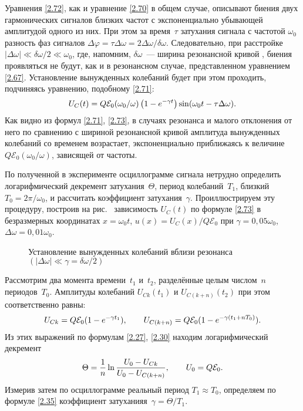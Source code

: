Уравнения \eqref{2.72}, как и уравнение \eqref{2.70} в общем случае, описывают
биения двух гармонических сигналов близких частот с экспоненциально убывающей
амплитудой одного из них. При этом за время~$\tau$ затухания сигнала с частотой
$\omega_0$ разность фаз сигналов
$\Delta\varphi=\tau\Delta\omega=2\Delta\omega/\delta\omega$. Следовательно, при
расстройке $|\Delta\omega|\ll\delta\omega/2\ll\omega_0$, где, напомним,
$\delta\omega$~--- ширина резонансной кривой , биения
проявляться не будут, как и в резонансном случае, представленном уравнением
\eqref{2.67}. Установление вынужденных колебаний будет при этом проходить,
подчиняясь уравнению, подобному \eqref{2.71}:
\begin{equation}\eqmark{2.73}
	U_C(t)=Q\mathcal{E}_0(\omega_0/\omega)\left(1-e^{-\gamma
t}\right)\sin(\omega_0t-\tau\Delta\omega).
\end{equation}
Как видно из формул \eqref{2.71}, \eqref{2.73}, в случаях резонанса и малого
отклонения от него по сравнению с шириной резонансной кривой амплитуда
вынужденных колебаний со временем возрастает, экспоненциально приближаясь к величине $Q\mathcal{E}_0(\omega_0/\omega)$, зависящей от частоты.

По полученной в эксперименте осциллограмме сигнала нетрудно определить
логарифмический декремент затухания~$\Theta$, период колебаний~$T_1$, близкий
$T_0=2\pi/\omega_0$, и рассчитать коэффициент затухания~$\gamma$. Проиллюстрируем эту процедуру, построив на рис.~
зависимость $U_C(t)$ по формуле \eqref{2.73} в безразмерных координатах $x = \omega_0t$, $u(x) = U_C(x)/Q\mathcal{E}_0$ при $\gamma = 0,05\omega_0$, $\Delta \omega = 0,01\omega_0$.
\begin{figure}[h!]
	\centering
	\caption{Установление вынужденных колебаний вблизи резонанса
$(|\Delta\omega|\ll\gamma=\delta\omega/2)$}
\end{figure}
Рассмотрим два момента времени~$t_1$ и~$t_2$, разделённые целым числом~$n$
периодов~$T_0$. Амплитуды колебаний $U_{Ck}(t_1)$ и $U_{C(k+n)}(t_2)$ при этом
соответственно равны:
\begin{equation}\eqmark{2.74}
U_{Ck}=Q\mathcal{E}_0(1-e^{-\gamma t_1}), \qquad U_{C(k+n)}=Q\mathcal{E}_0(1-e^{-\gamma(t_1+nT_0)}).
\end{equation}
Из этих выражений по формулам \eqref{2.27}, \eqref{2.30} находим логарифмический декремент
\begin{equation}\eqmark{2.75}
\Theta=\dfrac{1}{n}\ln\dfrac{U_0-U_{Ck}}{U_0-U_{C(k+n)}}, \qquad U_0 = Q\mathcal{E}_0.
\end{equation}
Измерив затем по осциллограмме реальный период $T_1\approx T_0$, определяем по формуле \eqref{2.35} коэффициент затуханияя~$\gamma = \Theta/T_1$.

